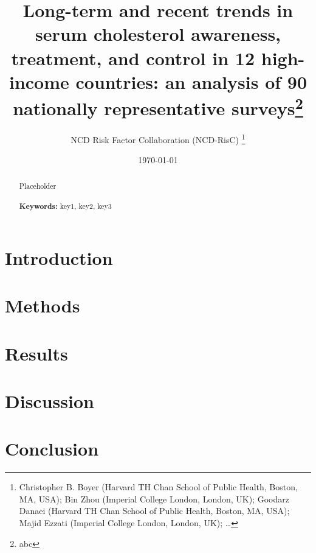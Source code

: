 \documentclass[12pt]{article}
\begin{document}
\begin{titlepage}
\title{Long-term and recent trends in serum cholesterol awareness, treatment, and control in 12 high-income countries: an analysis of 90 nationally representative surveys\thanks{abc}}
\author{NCD Risk Factor Collaboration (NCD-RisC) 
    \thanks{Christopher B. Boyer (Harvard TH Chan School of Public Health, Boston, MA, USA); Bin Zhou (Imperial College London, London, UK); Goodarz Danaei (Harvard TH Chan School of Public Health, Boston, MA, USA); Majid Ezzati (Imperial College London, London, UK); \ldots}}
\date{\today}
\maketitle
\begin{abstract}
\noindent Placeholder\\
\vspace{0in}\\
\noindent\textbf{Keywords:} key1, key2, key3\\

\bigskip
\end{abstract}
\setcounter{page}{0}
\thispagestyle{empty}
\end{titlepage}
\pagebreak \newpage

    


\doublespacing


\section{Introduction} \label{sec:introduction}

\section{Methods} \label{sec:methods}

\section{Results} \label{sec:result}

\section{Discussion} \label{sec:discussion}

\section{Conclusion} \label{sec:conclusion}
\end{document}
